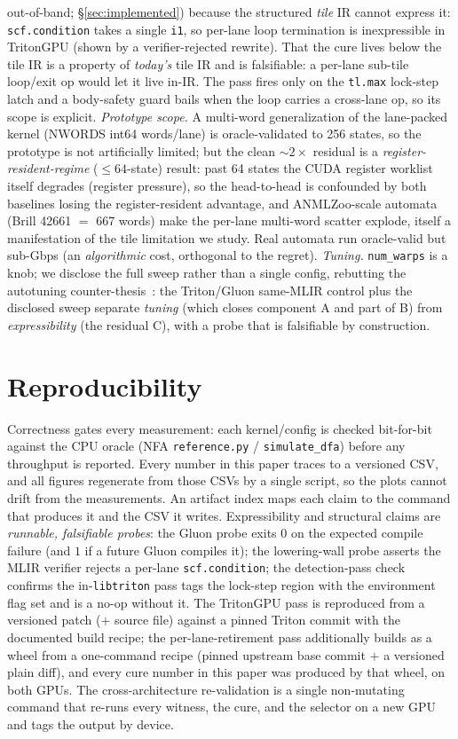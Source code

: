 \documentclass[sigplan,review,anonymous,10pt]{acmart}
\begin{document}
out-of-band; \S\ref{sec:implemented}) because the structured \emph{tile} IR cannot express it:
\texttt{scf.condition} takes a single \texttt{i1}, so per-lane loop termination is inexpressible in
TritonGPU (shown by a verifier-rejected rewrite). That the cure lives below the tile IR is a property of
\emph{today's} tile IR and is falsifiable: a per-lane sub-tile loop/exit op would let it live in-IR. The
pass fires only on the \texttt{tl.max} lock-step latch and a body-safety guard bails when the loop carries
a cross-lane op, so its scope is explicit. \emph{Prototype scope.} A multi-word
generalization of the lane-packed kernel (NWORDS int64 words/lane) is oracle-validated to 256 states,
so the prototype is not artificially limited; but the clean ${\sim}2\times$ residual is a
\emph{register-resident-regime} ($\le 64$-state) result: past 64 states the CUDA register worklist
itself degrades (register pressure), so the head-to-head is confounded by both baselines losing the
register-resident advantage, and ANMLZoo-scale automata (Brill 42661 $=$ 667 words) make the per-lane
multi-word scatter explode, itself a manifestation of the tile limitation we study. Real automata run
oracle-valid but sub-Gbps (an \emph{algorithmic} cost, orthogonal to the regret). \emph{Tuning.} \texttt{num\_warps} is a knob; we
disclose the full sweep rather than a single config, rebutting the autotuning
counter-thesis~\cite{ringlein2025}: the Triton/Gluon same-MLIR control plus the disclosed sweep
separate \emph{tuning} (which closes component A and part of B) from \emph{expressibility} (the
residual C), with a probe that is falsifiable by construction.

\section{Reproducibility}
Correctness gates every measurement: each kernel/config is checked bit-for-bit against the CPU oracle
(NFA \texttt{reference.py} / \texttt{simulate\_dfa}) before any throughput is reported. Every number in
this paper traces to a versioned CSV, and all figures regenerate from those CSVs by a single script, so
the plots cannot drift from the measurements. An artifact index maps each claim to the command that
produces it and the CSV it writes. Expressibility and structural claims are \emph{runnable, falsifiable
probes}: the Gluon probe exits $0$ on the expected compile failure (and $1$ if a future Gluon compiles
it); the lowering-wall probe asserts the MLIR verifier rejects a per-lane \texttt{scf.condition}; the
detection-pass check confirms the in-\texttt{libtriton} pass tags the lock-step region with the
environment flag set and is a no-op without it. The TritonGPU pass is reproduced from a versioned patch
($+$ source file) against a pinned Triton commit with the documented build recipe; the
per-lane-retirement pass additionally builds as a wheel from a one-command recipe (pinned upstream
base commit $+$ a versioned plain diff), and every cure number in this paper was produced by that
wheel, on both GPUs. The
cross-architecture re-validation is a single non-mutating command that re-runs every witness, the cure,
and the selector on a new GPU and tags the output by device.
\end{document}
